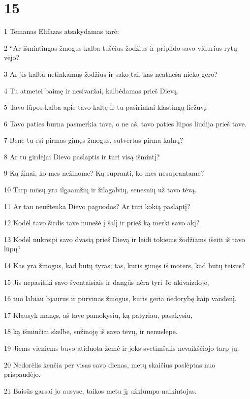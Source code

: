 \chapter{15}


\par 1 Temanas Elifazas atsakydamas tarė: 
\par 2 “Ar išmintingas žmogus kalba tuščius žodžius ir pripildo savo vidurius rytų vėjo? 
\par 3 Ar jis kalba netinkamus žodžius ir sako tai, kas neatneša nieko gero? 
\par 4 Tu atmetei baimę ir nesivaržai, kalbėdamas prieš Dievą. 
\par 5 Tavo lūpos kalba apie tavo kaltę ir tu pasirinkai klastingą liežuvį. 
\par 6 Tavo paties burna pasmerkia tave, o ne aš, tavo paties lūpos liudija prieš tave. 
\par 7 Bene tu esi pirmas gimęs žmogus, sutvertas pirma kalnų? 
\par 8 Ar tu girdėjai Dievo paslaptis ir turi visą išmintį? 
\par 9 Ką žinai, ko mes nežinome? Ką supranti, ko mes nesuprantame? 
\par 10 Tarp mūsų yra ilgaamžių ir žilagalvių, senesnių už tavo tėvą. 
\par 11 Ar tau neužtenka Dievo paguodos? Ar turi kokią paslaptį? 
\par 12 Kodėl tavo širdis tave nunešė į šalį ir prieš ką merki savo akį? 
\par 13 Kodėl nukreipi savo dvasią prieš Dievą ir leidi tokiems žodžiams išeiti iš tavo lūpų? 
\par 14 Kas yra žmogus, kad būtų tyras; tas, kuris gimęs iš moters, kad būtų teisus? 
\par 15 Jis nepasitiki savo šventaisiais ir dangūs nėra tyri Jo akivaizdoje, 
\par 16 tuo labiau bjaurus ir purvinas žmogus, kuris geria nedorybę kaip vandenį. 
\par 17 Klausyk manęs, aš tave pamokysiu, ką patyriau, pasakysiu, 
\par 18 ką išminčiai skelbė, sužinoję iš savo tėvų, ir nenuslėpė. 
\par 19 Jiems vieniems buvo atiduota žemė ir joks svetimšalis nevaikščiojo tarp jų. 
\par 20 Nedorėlis kenčia per visas savo dienas, metų skaičius paslėptas nuo prispaudėjo. 
\par 21 Baisūs garsai jo ausyse, taikos metu jį užklumpa naikintojas. 
